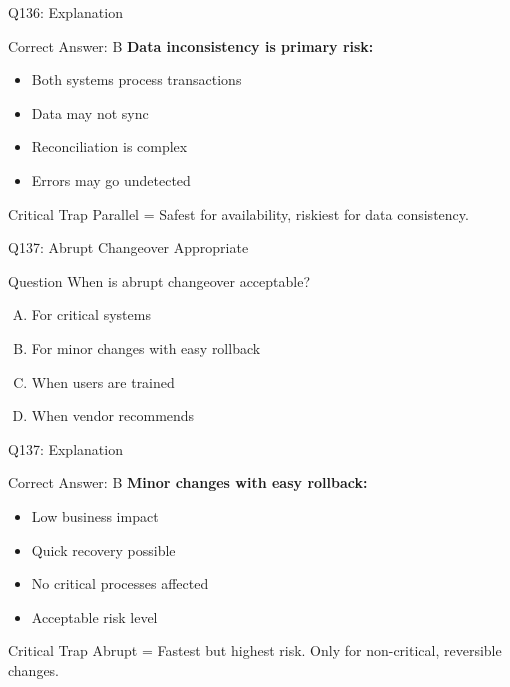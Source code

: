 \documentclass{beamer}
\begin{document}
	\begin{frame}{Q136: Explanation}
		\begin{block}{Correct Answer: B}
			\textbf{Data inconsistency is primary risk:}
			\begin{itemize}
				\item Both systems process transactions
				\item Data may not sync
				\item Reconciliation is complex
				\item Errors may go undetected
			\end{itemize}
		\end{block}
		\begin{alertblock}{Critical Trap}
			Parallel = Safest for availability, riskiest for data consistency.
		\end{alertblock}
	\end{frame}
	
	\begin{frame}{Q137: Abrupt Changeover Appropriate}
		\begin{block}{Question}
			When is abrupt changeover acceptable?
		\end{block}
		\begin{enumerate}[(A)]
			\item For critical systems
			\item For minor changes with easy rollback
			\item When users are trained
			\item When vendor recommends
		\end{enumerate}
	\end{frame}
	
	\begin{frame}{Q137: Explanation}
		\begin{block}{Correct Answer: B}
			\textbf{Minor changes with easy rollback:}
			\begin{itemize}
				\item Low business impact
				\item Quick recovery possible
				\item No critical processes affected
				\item Acceptable risk level
			\end{itemize}
		\end{block}
		\begin{alertblock}{Critical Trap}
			Abrupt = Fastest but highest risk.
			Only for non-critical, reversible changes.
		\end{alertblock}
	\end{frame}
	
\end{document}
